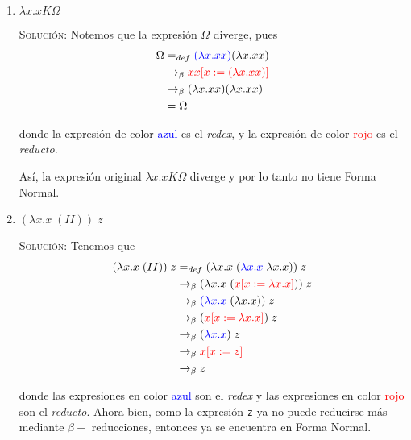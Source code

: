 \documentclass[letterpaper,11pt]{article}
\begin{document}
\begin{enumerate}
    \begin{enumerate}
        \item $\lambda x.xK\Omega$

        \textsc{Solución:} Notemos que la expresión $\Omega$ diverge, pues
        \begin{align*}
            \Omega 
            &=_{def} \textcolor{blue}{(\lambda x.xx)} (\lambda x.xx) \\
            &\rightarrow_{\beta} 
               \textcolor{red}{xx [x := (\lambda x.xx)]} \\
            &\rightarrow_{\beta} (\lambda x.xx)(\lambda x.xx) \\ 
            &= \Omega
        \end{align*}

        donde la expresión de color \textcolor{blue}{azul} es el \textit{redex}, 
        y la expresión de color \textcolor{red}{rojo} es el \textit{reducto}.

        Así, la expresión original $\lambda x.xK\Omega$ diverge y por lo tanto 
        no tiene Forma Normal.

        \item $(\lambda x.x \; (II)) \; z$

        \textsc{Solución:} Tenemos que 
        \begin{align*}
            (\lambda x.x \; (II)) \; z 
            &=_{def} (\lambda x.x \; (\textcolor{blue}{\lambda x.x} \;
                                      \lambda x.x)) \; z \\
            &\rightarrow_{\beta} (\lambda x.x \; 
                                 (\textcolor{red}{x [x := \lambda x.x]})) 
                                 \; z \\
            &\rightarrow_{\beta}
            \textcolor{blue}{(\lambda x.x} \; (\lambda x.x)) \; z \\ 
            &\rightarrow_{\beta} (\textcolor{red}{x [x := \lambda x.x]}) \; z \\ 
            &\rightarrow_{\beta} (\textcolor{blue}{\lambda x.x}) \; z \\
            &\rightarrow_{\beta} \textcolor{red}{x [x := z]} \\
            &\rightarrow_{\beta} z
        \end{align*}

        donde las expresiones en color \textcolor{blue}{azul} son el 
        \textit{redex} y las expresiones en color \textcolor{red}{rojo} son el 
        \textit{reducto}. Ahora bien, como la expresión \texttt{z} ya no puede
        reducirse más mediante $\beta-$ reducciones, entonces ya se encuentra 
        en Forma Normal.


\end{enumerate}
\end{enumerate}
\end{document}

